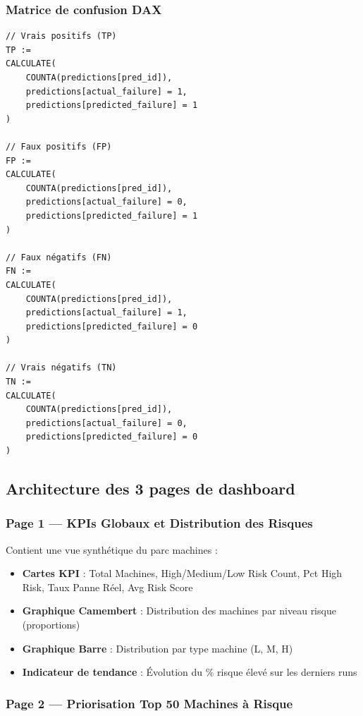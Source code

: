 \documentclass[a4paper,12pt,twoside]{report}
\begin{document}
\subsubsection{Matrice de confusion DAX}

\begin{lstlisting}[language=DAX]
// Vrais positifs (TP)
TP := 
CALCULATE(
    COUNTA(predictions[pred_id]),
    predictions[actual_failure] = 1,
    predictions[predicted_failure] = 1
)

// Faux positifs (FP)
FP := 
CALCULATE(
    COUNTA(predictions[pred_id]),
    predictions[actual_failure] = 0,
    predictions[predicted_failure] = 1
)

// Faux négatifs (FN)
FN := 
CALCULATE(
    COUNTA(predictions[pred_id]),
    predictions[actual_failure] = 1,
    predictions[predicted_failure] = 0
)

// Vrais négatifs (TN)
TN := 
CALCULATE(
    COUNTA(predictions[pred_id]),
    predictions[actual_failure] = 0,
    predictions[predicted_failure] = 0
)
\end{lstlisting}

\subsection{Architecture des 3 pages de dashboard}

\subsubsection{Page 1 — KPIs Globaux et Distribution des Risques}

Contient une vue synthétique du parc machines :

\begin{itemize}
    \item \textbf{Cartes KPI} : Total Machines, High/Medium/Low Risk Count, Pct High Risk, Taux Panne Réel, Avg Risk Score
    \item \textbf{Graphique Camembert} : Distribution des machines par niveau risque (proportions)
    \item \textbf{Graphique Barre} : Distribution par type machine (L, M, H)
    \item \textbf{Indicateur de tendance} : Évolution du \% risque élevé sur les derniers runs
\end{itemize}

\subsubsection{Page 2 — Priorisation Top 50 Machines à Risque}
\end{document}
